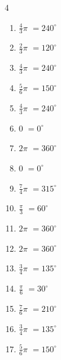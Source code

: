 \begin{multicols}{4}
\begin{enumerate}
  \item $\displaystyle \frac{4}{3}\pi$
        $\displaystyle =240^{\circ}$

  \item $\displaystyle \frac{2}{3}\pi$
        $\displaystyle =120^{\circ}$

  \item $\displaystyle \frac{4}{3}\pi$
        $\displaystyle =240^{\circ}$

  \item $\displaystyle \frac{5}{6}\pi$
        $\displaystyle =150^{\circ}$

  \item $\displaystyle \frac{4}{3}\pi$
        $\displaystyle =240^{\circ}$

  \item $\displaystyle 0$
        $\displaystyle =0^{\circ}$

  \item $\displaystyle 2\pi$
        $\displaystyle =360^{\circ}$

  \item $\displaystyle 0$
        $\displaystyle =0^{\circ}$

  \item $\displaystyle \frac{7}{4}\pi$
        $\displaystyle =315^{\circ}$

  \item $\displaystyle \frac{\pi}{3}$
        $\displaystyle =60^{\circ}$

  \item $\displaystyle 2\pi$
        $\displaystyle =360^{\circ}$

  \item $\displaystyle 2\pi$
        $\displaystyle =360^{\circ}$

  \item $\displaystyle \frac{3}{4}\pi$
        $\displaystyle =135^{\circ}$

\columnbreak %

  \item $\displaystyle \frac{\pi}{6}$
        $\displaystyle =30^{\circ}$

  \item $\displaystyle \frac{7}{6}\pi$
        $\displaystyle =210^{\circ}$

  \item $\displaystyle \frac{3}{4}\pi$
        $\displaystyle =135^{\circ}$

  \item $\displaystyle \frac{5}{6}\pi$
        $\displaystyle =150^{\circ}$


\end{enumerate}
\end{multicols}
